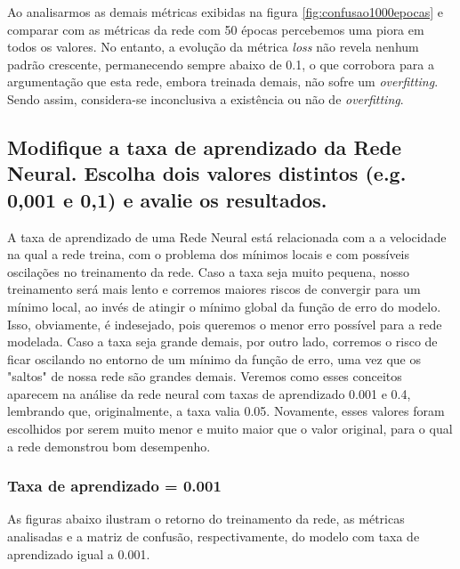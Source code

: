 \documentclass[12pt]{article}
\begin{document}
Ao analisarmos as demais métricas exibidas na figura \ref{fig:confusao1000epocas} e comparar com as métricas da rede com 50 épocas percebemos uma piora em todos os valores. No entanto, a evolução da métrica \textit{loss} não revela nenhum padrão crescente, permanecendo sempre abaixo de 0.1, o que corrobora para a argumentação que esta rede, embora treinada demais, não sofre um \textit{overfitting}. Sendo assim, considera-se inconclusiva a existência ou não de \textit{overfitting}.

\subsection{Modifique a taxa de aprendizado da Rede Neural. Escolha dois valores distintos (e.g. 0,001 e 0,1) e avalie os resultados.}

A taxa de aprendizado de uma Rede Neural está relacionada com a a velocidade na qual a rede treina, com o problema dos mínimos locais e com possíveis oscilações no treinamento da rede. Caso a taxa seja muito pequena, nosso treinamento será mais lento e corremos maiores riscos de convergir para um mínimo local, ao invés de atingir o mínimo global da função de erro do modelo. Isso, obviamente, é indesejado, pois queremos o menor erro possível para a rede modelada. Caso a taxa seja grande demais, por outro lado, corremos o risco de ficar oscilando no entorno de um mínimo da função de erro, uma vez que os "saltos" de nossa rede são grandes demais. Veremos como esses conceitos aparecem na análise da rede neural com taxas de aprendizado 0.001 e 0.4, lembrando que, originalmente, a taxa valia 0.05. Novamente, esses valores foram escolhidos por serem muito menor e muito maior que o valor original, para o qual a rede demonstrou bom desempenho.

\subsubsection{Taxa de aprendizado = 0.001}

As figuras abaixo ilustram o retorno do treinamento da rede, as métricas analisadas e a matriz de confusão, respectivamente, do modelo com taxa de aprendizado igual a 0.001. 
\end{document}
